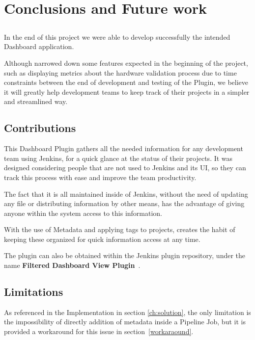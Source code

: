 \chapter{Conclusions and Future work} \label{ch:concl}

\section*{}

In the end of this project we were able to develop successfully the intended Dashboard application. 

Although narrowed down some features expected in the beginning of the project, such as displaying metrics about the hardware validation process due to time constraints between the end of development and testing  of the Plugin, we believe it will greatly help development teams to keep track of their projects in a simpler and streamlined way. 

\section{Contributions}
This Dashboard Plugin gathers all the needed information for any development team using Jenkins, for a quick glance at the status of their projects. It was designed considering people that are not used to Jenkins and its UI, so they can track this process with ease and improve the team productivity.

The fact that it is all maintained inside of Jenkins, without the need of updating any file or distributing information by other means, has the advantage of giving anyone within the system access to this information. 

With the use of Metadata and applying tags to projects, creates the habit of keeping these organized for quick information access at any time.

The plugin can also be obtained within the Jenkins plugin repository, under the name \textbf{Filtered Dashboard View Plugin}~\cite{jksn:myplugin}.

\section{Limitations}

As referenced in the Implementation in section \ref{ch:solution}, the only limitation is the impossibility of directly addition of metadata inside a Pipeline Job, but it is provided a workaround for this issue in section~\ref{workaraound}.

